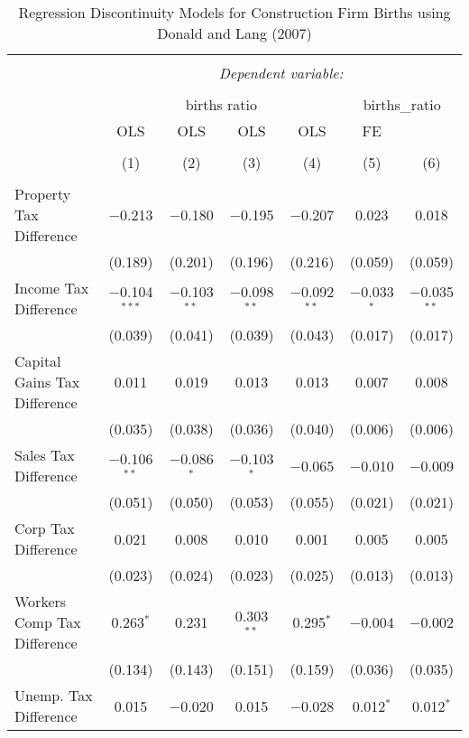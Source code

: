 
\begin{table}[!htbp] \centering 
  \caption{Regression Discontinuity Models for  Construction Firm Births using Donald and Lang (2007)} 
  \label{} 
\begin{tabular}{@{\extracolsep{5pt}}lcccccc} 
\\[-1.8ex]\hline 
\hline \\[-1.8ex] 
 & \multicolumn{6}{c}{\textit{Dependent variable:}} \\ 
\cline{2-7} 
\\[-1.8ex] & \multicolumn{4}{c}{births ratio} & \multicolumn{2}{c}{births\_ratio} \\ 
 & OLS & OLS & OLS & OLS & FE &  \\ 
\\[-1.8ex] & (1) & (2) & (3) & (4) & (5) & (6)\\ 
\hline \\[-1.8ex] 
 Property Tax Difference & $-$0.213 & $-$0.180 & $-$0.195 & $-$0.207 & 0.023 & 0.018 \\ 
  & (0.189) & (0.201) & (0.196) & (0.216) & (0.059) & (0.059) \\ 
  Income Tax Difference & $-$0.104$^{***}$ & $-$0.103$^{**}$ & $-$0.098$^{**}$ & $-$0.092$^{**}$ & $-$0.033$^{*}$ & $-$0.035$^{**}$ \\ 
  & (0.039) & (0.041) & (0.039) & (0.043) & (0.017) & (0.017) \\ 
  Capital Gains Tax Difference & 0.011 & 0.019 & 0.013 & 0.013 & 0.007 & 0.008 \\ 
  & (0.035) & (0.038) & (0.036) & (0.040) & (0.006) & (0.006) \\ 
  Sales Tax Difference & $-$0.106$^{**}$ & $-$0.086$^{*}$ & $-$0.103$^{*}$ & $-$0.065 & $-$0.010 & $-$0.009 \\ 
  & (0.051) & (0.050) & (0.053) & (0.055) & (0.021) & (0.021) \\ 
  Corp Tax Difference & 0.021 & 0.008 & 0.010 & 0.001 & 0.005 & 0.005 \\ 
  & (0.023) & (0.024) & (0.023) & (0.025) & (0.013) & (0.013) \\ 
  Workers Comp Tax Difference & 0.263$^{*}$ & 0.231 & 0.303$^{**}$ & 0.295$^{*}$ & $-$0.004 & $-$0.002 \\ 
  & (0.134) & (0.143) & (0.151) & (0.159) & (0.036) & (0.035) \\ 
  Unemp. Tax Difference & 0.015 & $-$0.020 & 0.015 & $-$0.028 & 0.012$^{*}$ & 0.012$^{*}$ \\ 

\end{tabular}
\end{table}
